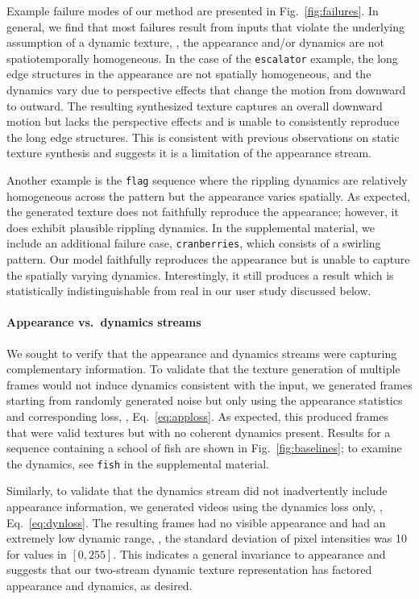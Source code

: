 Example failure modes of our method are presented in Fig.\ 
\ref{fig:failures}.
In general, we find that most failures result from inputs that
violate the underlying assumption of a dynamic texture, \ie, 
the appearance and/or dynamics are not spatiotemporally homogeneous.
In the case of the \texttt{escalator} example, the long edge 
structures in the appearance are not spatially homogeneous, 
and the dynamics vary due to perspective effects that
change the motion from downward to outward.
The resulting synthesized texture captures an overall downward 
motion but lacks the perspective effects and is unable to 
consistently reproduce the long edge structures.
This is consistent with previous observations
on static texture synthesis \cite{gatys2015} and suggests it is a 
limitation of the appearance stream.

Another example is the \texttt{flag} sequence where the rippling 
dynamics are relatively homogeneous across the pattern but the 
appearance  varies spatially.
As expected, the generated texture does not faithfully
reproduce the appearance; however, it does exhibit plausible 
rippling dynamics.
In the supplemental material, we include an additional failure 
case, \texttt{cranberries}, which consists of a swirling pattern.
Our model faithfully reproduces the appearance
but is unable to capture the spatially varying dynamics.
Interestingly, it still produces a result
which is statistically indistinguishable from real in our user 
study discussed below.

\paragraph*{Appearance vs.\ dynamics streams}



We sought to verify that the appearance and dynamics
streams were capturing complementary information.
To validate that the texture generation of multiple frames
would not induce dynamics consistent with the input, we generated
frames starting from randomly generated noise but only using the
appearance statistics and corresponding loss, \ie,
Eq.\ \ref{eq:apploss}.
As expected, this produced frames that were valid textures but
with no coherent dynamics present.
Results for a sequence containing a school of fish are shown in
Fig.\ \ref{fig:baselines}; to examine the dynamics, see 
\texttt{fish} in the supplemental material.

Similarly, to validate that the dynamics stream did not 
inadvertently include appearance information, we generated videos
using the dynamics loss only, \ie, Eq.\ \ref{eq:dynloss}.
The resulting frames had no visible appearance and had
an extremely low dynamic range, \ie, the standard
deviation of pixel intensities was 10 for values in $[0,255]$.
This indicates a general invariance to appearance and 
suggests that our two-stream dynamic texture representation
has factored appearance and dynamics, as desired.


